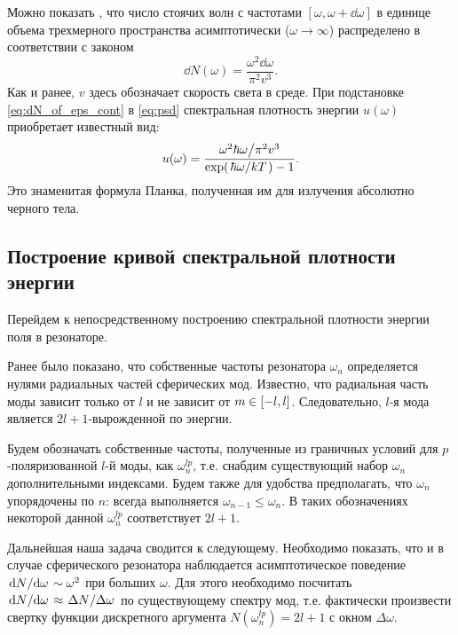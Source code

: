 \documentclass[12pt,a4paper]{article}
\begin{document}
        Можно показать \cite{sivuhin_opt}, что число стоячих волн с частотами $[\omega,\omega+\dd{\omega}]$ в единице объема трехмерного пространства асимптотически ($\omega \to \infty$) распределено в соответствии с законом
        \begin{equation}\label{eq:dN_of_eps_cont}
            \dd{N(\omega)} = \frac{\omega^2 \dd{\omega}}{\pi^2 v^3} .
        \end{equation}
        Как и ранее, $v$ здесь обозначает скорость света в среде. При подстановке \autoref{eq:dN_of_eps_cont} в \autoref{eq:psd} спектральная плотность энергии $u(\omega)$ приобретает известный вид:
        \begin{equation}
            u(\omega) = \frac{
                    \flatfrac{\omega^2 \hbar\omega}{\pi^2 v^3}
            }{\exp(\flatfrac{\hbar\omega}{kT}) - 1} .
        \end{equation}
        Это знаменитая формула Планка, полученная им для излучения абсолютно черного тела.


    \subsection{Построение кривой спектральной плотности энергии}

        Перейдем к непосредственному построению спектральной плотности энергии поля в резонаторе.

        Ранее было показано, что собственные частоты резонатора $\omega_n$ определяется нулями радиальных частей сферических мод. Известно, что радиальная часть моды зависит только от $l$ и не зависит от $m \in \qty[-l,l]$. Следовательно, $l$-я мода является $2l + 1$-вырожденной по энергии.

        Будем обозначать собственные частоты, полученные из граничных условий для $p$-поляризованной $l$-й моды, как $\omega^{lp}_n$, т.е. снабдим существующий набор $\omega_n$ дополнительными индексами. Будем также для удобства предполагать, что $\omega_n$ упорядочены по $n$: всегда выполняется $\omega_{n-1} \le \omega_n$. В таких обозначениях некоторой данной $\omega^{lp}_n$ соответствует $2l + 1$.

        Дальнейшая наша задача сводится к следующему. Необходимо показать, что и в случае сферического резонатора наблюдается асимптотическое поведение $\dv*{N}{\omega} \sim \omega^2$ при больших $\omega$. Для этого необходимо посчитать $\dv*{N}{\omega} \approx \flatfrac{\Delta N}{\Delta \omega}$ по существующему спектру мод, т.е. фактически произвести свертку функции дискретного аргумента $N(\omega^{lp}_n) = 2l + 1$ с окном $\Delta \omega$.
\end{document}
